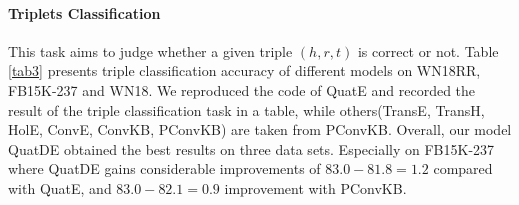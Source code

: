 \documentclass[letterpaper]{article} \usepackage{aaai20}  \usepackage{times}  \usepackage{helvet} \usepackage{courier}  \usepackage[hyphens]{url}  \usepackage{graphicx} \usepackage{lineno,hyperref,amsmath,amssymb}
\begin{document}
\paragraph{\textbf{Triplets Classification}}This task aims to judge whether a given triple $(h,r,t)$ is correct or not. Table \ref{tab3} presents triple classification accuracy of different models on WN18RR, FB15K-237 and WN18. We reproduced the code of QuatE and recorded the result of the triple classification task in a table, while others(TransE\cite{bordes2013translating}, TransH\cite{wang2014knowledge}, HolE\cite{nickel2016holographic}, ConvE\cite{dettmers2018convolutional}, ConvKB\cite{nguyen2017novel}, PConvKB\cite{jia2020improving}) are taken from PConvKB\cite{jia2020improving}. Overall, our model QuatDE obtained the best results on three data sets. Especially on FB15K-237 where QuatDE gains considerable improvements of $83.0-81.8=1.2$ compared with QuatE, and $83.0-82.1=0.9$ improvement with PConvKB.

\begin{table}[h]
\centering
{}
\caption{\textbf{Triplets classification result.}}
\label{tab3}
\end{table}
\end{document}
